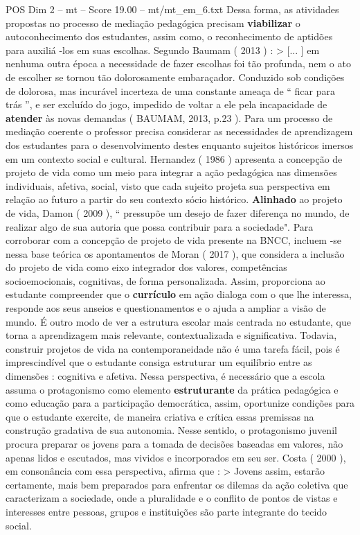 \begin{textsample}{POS Dim 2 – mt – Score 19.00 – mt/mt\_em\_6.txt}
Dessa forma, as atividades propostas no processo de mediação pedagógica precisam \textbf{viabilizar} o autoconhecimento dos estudantes, assim como, o reconhecimento de aptidões para auxiliá -los em suas escolhas.
Segundo Baumam ( 2013 ) : > [... ] em nenhuma outra época a necessidade de fazer escolhas foi tão profunda, nem o ato de escolher se tornou tão dolorosamente embaraçador.
Conduzido sob condições de dolorosa, mas incurável incerteza de uma constante ameaça de “ ficar para trás ”, e ser excluído do jogo, impedido de voltar a ele pela incapacidade de \textbf{atender} às novas demandas ( BAUMAM, 2013, p.23 ).
Para um processo de mediação coerente o professor precisa considerar as necessidades de aprendizagem dos estudantes para o desenvolvimento destes enquanto sujeitos históricos imersos em um contexto social e cultural.
Hernandez ( 1986 ) apresenta a concepção de projeto de vida como um meio para integrar a ação pedagógica nas dimensões individuais, afetiva, social, visto que cada sujeito projeta sua perspectiva em relação ao futuro a partir do seu contexto sócio histórico. \textbf{Alinhado} ao projeto de vida, Damon ( 2009 ), “ pressupõe um desejo de fazer diferença no mundo, de realizar algo de sua autoria que possa contribuir para a sociedade".
Para corroborar com a concepção de projeto de vida presente na BNCC, incluem -se nessa base teórica os apontamentos de Moran ( 2017 ), que considera a inclusão do projeto de vida como eixo integrador dos valores, competências socioemocionais, cognitivas, de forma personalizada.
Assim, proporciona ao estudante compreender que o \textbf{currículo} em ação dialoga com o que lhe interessa, responde aos seus anseios e questionamentos e o ajuda a ampliar a visão de mundo.
É outro modo de ver a estrutura escolar mais centrada no estudante, que torna a aprendizagem mais relevante, contextualizada e significativa.
Todavia, construir projetos de vida na contemporaneidade não é uma tarefa fácil, pois é imprescindível que o estudante consiga estruturar um equilíbrio entre as dimensões : cognitiva e afetiva.
Nessa perspectiva, é necessário que a escola assuma o protagonismo como elemento \textbf{estruturante} da prática pedagógica e como educação para a participação democrática, assim, oportunize condições para que o estudante exercite, de maneira criativa e crítica essas premissas na construção gradativa de sua autonomia.
Nesse sentido, o protagonismo juvenil procura preparar os jovens para a tomada de decisões baseadas em valores, não apenas lidos e escutados, mas vividos e incorporados em seu ser.
Costa ( 2000 ), em consonância com essa perspectiva, afirma que : > Jovens assim, estarão certamente, mais bem preparados para enfrentar os dilemas da ação coletiva que caracterizam a sociedade, onde a pluralidade e o conflito de pontos de vistas e interesses entre pessoas, grupos e instituições são parte integrante do tecido social.

\end{textsample}
